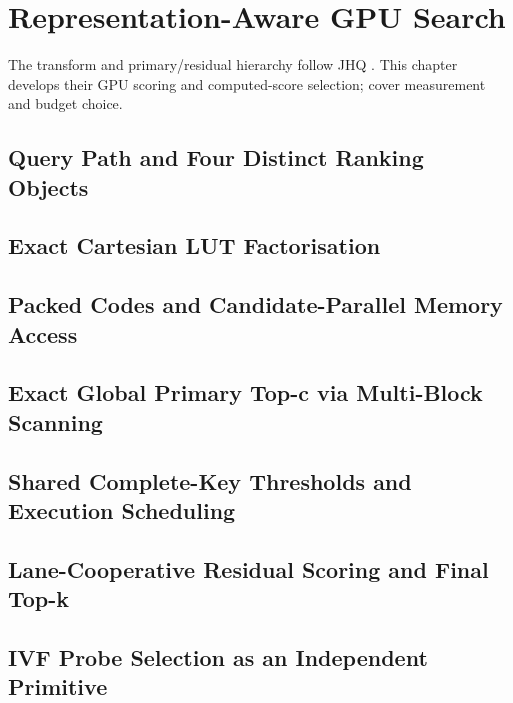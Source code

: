 \chapter{Representation-Aware GPU Search}
\label{ch:gpu-execution}
The transform and primary/residual hierarchy follow JHQ \cite{jhq}.
This chapter develops their GPU scoring and computed-score selection;
 cover measurement and budget choice.

\section{Query Path and Four Distinct Ranking Objects}
\label{sec:5-1}


\section{Exact Cartesian LUT Factorisation}
\label{sec:5-2}


\section{Packed Codes and Candidate-Parallel Memory Access}
\label{sec:5-3}


\section{Exact Global Primary Top-c via Multi-Block Scanning}
\label{sec:5-4}


\section{Shared Complete-Key Thresholds and Execution Scheduling}
\label{sec:5-5}


\section{Lane-Cooperative Residual Scoring and Final Top-k}
\label{sec:5-6}


\section{IVF Probe Selection as an Independent Primitive}
\label{sec:5-7}

